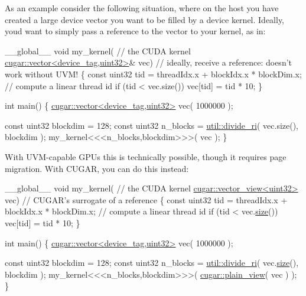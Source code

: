 \begin{DoxyParagraph}{}
As an example consider the following situation, where on the host you have created a large device vector you want to be filled by a device kernel. Ideally, you\textquotesingle{}d want to simply pass a reference to the vector to your kernel, as in\+: 
\begin{DoxyCode}
\_\_global\_\_ \textcolor{keywordtype}{void} my\_kernel(                   \textcolor{comment}{// the CUDA kernel}
    \hyperlink{structcugar_1_1vector}{cugar::vector<device\_tag,uint32>}& vec)   \textcolor{comment}{// ideally, receive a
       reference: doesn't work without UVM!}
\{
    \textcolor{keyword}{const} uint32 tid = threadIdx.x + blockIdx.x * blockDim.x; \textcolor{comment}{// compute a linear thread id}
    \textcolor{keywordflow}{if} (tid < vec.size())
        vec[tid] = tid * 10;
\}

\textcolor{keywordtype}{int} main()
\{
    \hyperlink{structcugar_1_1vector}{cugar::vector<device\_tag,uint32>} vec( 1000000 );

    \textcolor{keyword}{const} uint32 blockdim = 128;
    \textcolor{keyword}{const} uint32 n\_blocks = \hyperlink{group___basic_utils_gabb6714186dbbd864f0a9298944ba509b}{util::divide\_ri}( vec.size(), blockdim ); 
    my\_kernel<<<n\_blocks,blockdim>>>( vec );
\}
\end{DoxyCode}
 
\end{DoxyParagraph}
\begin{DoxyParagraph}{}
With U\+V\+M-\/capable G\+P\+Us this is technically possible, though it requires page migration. With C\+U\+G\+AR, you can do this instead\+: 
\begin{DoxyCode}
\_\_global\_\_ \textcolor{keywordtype}{void} my\_kernel(                   \textcolor{comment}{// the CUDA kernel}
    \hyperlink{structcugar_1_1vector__view}{cugar::vector\_view<uint32>} vec)          \textcolor{comment}{// CUGAR's surrogate of a reference}
\{
    \textcolor{keyword}{const} uint32 tid = threadIdx.x + blockIdx.x * blockDim.x; \textcolor{comment}{// compute a linear thread id}
    \textcolor{keywordflow}{if} (tid < vec.\hyperlink{structcugar_1_1vector__view_a773841d0e535b07e40a99891e22d937e}{size}())
        vec[tid] = tid * 10;
\}

\textcolor{keywordtype}{int} main()
\{
    \hyperlink{structcugar_1_1vector}{cugar::vector<device\_tag,uint32>} vec( 1000000 );

    \textcolor{keyword}{const} uint32 blockdim = 128;
    \textcolor{keyword}{const} uint32 n\_blocks = \hyperlink{group___basic_utils_gabb6714186dbbd864f0a9298944ba509b}{util::divide\_ri}( vec.\hyperlink{structcugar_1_1vector__view_a773841d0e535b07e40a99891e22d937e}{size}(), blockdim );
    my\_kernel<<<n\_blocks,blockdim>>>( \hyperlink{namespacecugar_a347f91de482f0cb8dcba21c086b0aa46}{cugar::plain\_view}( vec ) );
\}
\end{DoxyCode}
 
\end{DoxyParagraph}
